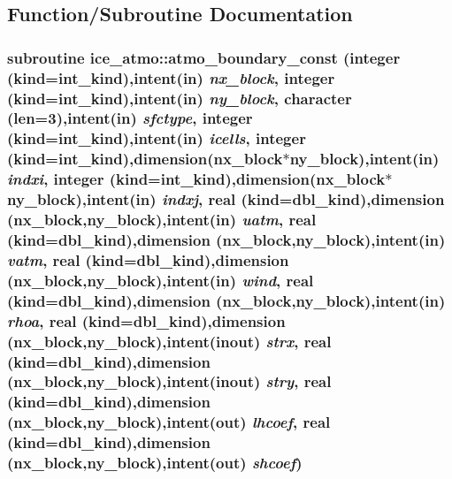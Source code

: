 \subsection{Function/Subroutine Documentation}
\hypertarget{namespaceice__atmo_a7f029ec02aa35ba56d71f83914b70a76}{
\subsubsection[{atmo\_\-boundary\_\-const}]{\setlength{\rightskip}{0pt plus 5cm}subroutine ice\_\-atmo::atmo\_\-boundary\_\-const (integer (kind=int\_\-kind),intent(in) {\em nx\_\-block}, \/  integer (kind=int\_\-kind),intent(in) {\em ny\_\-block}, \/  character (len=3),intent(in) {\em sfctype}, \/  integer (kind=int\_\-kind),intent(in) {\em icells}, \/  integer (kind=int\_\-kind),dimension(nx\_\-block$\ast$ny\_\-block),intent(in) {\em indxi}, \/  integer (kind=int\_\-kind),dimension(nx\_\-block$\ast$ny\_\-block),intent(in) {\em indxj}, \/  real (kind=dbl\_\-kind),dimension (nx\_\-block,ny\_\-block),intent(in) {\em uatm}, \/  real (kind=dbl\_\-kind),dimension (nx\_\-block,ny\_\-block),intent(in) {\em vatm}, \/  real (kind=dbl\_\-kind),dimension (nx\_\-block,ny\_\-block),intent(in) {\em wind}, \/  real (kind=dbl\_\-kind),dimension (nx\_\-block,ny\_\-block),intent(in) {\em rhoa}, \/  real (kind=dbl\_\-kind),dimension (nx\_\-block,ny\_\-block),intent(inout) {\em strx}, \/  real (kind=dbl\_\-kind),dimension (nx\_\-block,ny\_\-block),intent(inout) {\em stry}, \/  real (kind=dbl\_\-kind),dimension (nx\_\-block,ny\_\-block),intent(out) {\em lhcoef}, \/  real (kind=dbl\_\-kind),dimension (nx\_\-block,ny\_\-block),intent(out) {\em shcoef})}}
\label{namespaceice__atmo_a7f029ec02aa35ba56d71f83914b70a76}


